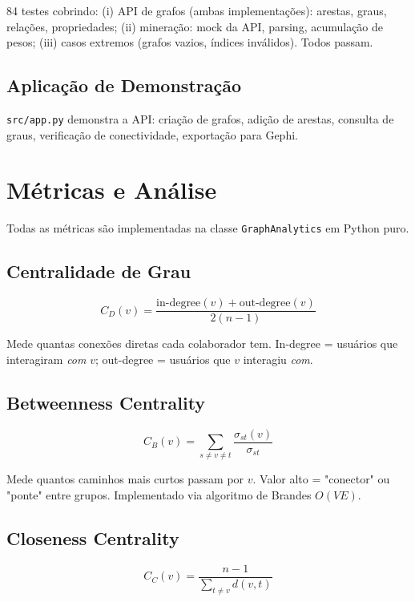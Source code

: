 \documentclass[12pt]{article}
\begin{document}
84 testes cobrindo: (i) API de grafos (ambas implementações): arestas, graus, relações, propriedades; (ii) mineração: mock da API, parsing, acumulação de pesos; (iii) casos extremos (grafos vazios, índices inválidos). Todos passam.

\subsection{Aplicação de Demonstração}

\texttt{src/app.py} demonstra a API: criação de grafos, adição de arestas, consulta de graus, verificação de conectividade, exportação para Gephi.

\section{Métricas e Análise}\label{sec:metricas}

Todas as métricas são implementadas na classe \texttt{GraphAnalytics} em Python puro.

\subsection{Centralidade de Grau}

\[
C_D(v) = \frac{\text{in-degree}(v) + \text{out-degree}(v)}{2(n-1)}
\]

Mede quantas conexões diretas cada colaborador tem. In-degree = usuários que interagiram \textit{com} $v$; out-degree = usuários que $v$ interagiu \textit{com}.

\subsection{Betweenness Centrality}

\[
C_B(v) = \sum_{s \neq v \neq t} \frac{\sigma_{st}(v)}{\sigma_{st}}
\]

Mede quantos caminhos mais curtos passam por $v$. Valor alto = "conector" ou "ponte" entre grupos. Implementado via algoritmo de Brandes $O(VE)$.

\subsection{Closeness Centrality}

\[
C_C(v) = \frac{n-1}{\sum_{t \neq v} d(v,t)}
\]
\end{document}
